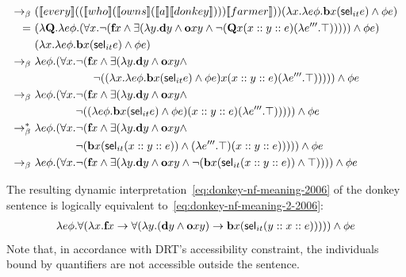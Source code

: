 \begin{example}
\begin{align}
\bconv \ &   (\trr{\I{every}}  ((\trr{\I{who}}  (\trr{\I{owns}}  (\trr{\I{a}}  \trr{\I{donkey}} ) ) ) \trr{\I{farmer}}  ))  ( \lambda \x1. \lambda e \phi.   \cbeat \x1  ( \selK_{it} e)  \land \phi e ) \notag \\
= \ &    ( \lambda  \Q2. \lambda e \phi. (\forall \x1. \neg ( \cfarmer \x1 \land   \exists (\lambda \y1.  \cdonkey \y1  \land  \cown \x1 \y1 \land  \neg (\Q2 \x1 (\upii{\x1}{\upii{\y1}{e}})  (\lambda e'''. \top)  ) ) ))  \land \phi e ) \notag \\
&  ( \lambda \x1. \lambda e \phi.   \cbeat \x1  ( \selK_{it} e)  \land \phi e ) \notag \\
\bconv \ &    \lambda e \phi. (\forall \x1. \neg ( \cfarmer \x1 \land   \exists (\lambda \y1.  \cdonkey \y1  \land  \cown \x1 \y1 \land \notag \\
& \phantom{aaaaaaaaaa}  \neg (( \lambda \x1. \lambda e \phi.   \cbeat \x1  ( \selK_{it} e)  \land \phi e ) \x1 (\upii{\x1}{\upii{\y1}{e}})  (\lambda e'''. \top)  ) ) ))  \land \phi e    \notag \\
\bconv \ &  \lambda e \phi. (\forall \x1. \neg ( \cfarmer \x1 \land   \exists (\lambda \y1.  \cdonkey \y1  \land  \cown \x1 \y1 \land \notag \\
& \phantom{aaaaaaa} \neg (( \lambda e \phi.   \cbeat \x1  ( \selK_{it} e)  \land \phi e ) (\upii{\x1}{\upii{\y1}{e}})  (\lambda e'''. \top)  ) ) ))  \land \phi e    \notag \\
\bred \ &  \lambda e \phi. (\forall \x1. \neg ( \cfarmer \x1 \land   \exists (\lambda \y1.  \cdonkey \y1  \land  \cown \x1 \y1 \land \notag \\
& \phantom{aaaaaaa} \neg (  \cbeat \x1  ( \selK_{it}  (\upii{\x1}{\upii{\y1}{e}}))  \land (\lambda e'''. \top)  (\upii{\x1}{\upii{\y1}{e}})   ) ) ))  \land \phi e    \notag \\
\bconv \ &\lambda e \phi. (\forall \x1. \neg ( \cfarmer \x1 \land   \exists (\lambda \y1.  \cdonkey \y1  \land  \cown \x1 \y1 \land  \neg (  \cbeat \x1  ( \selK_{it}  (\upii{\x1}{\upii{\y1}{e}}))  \land  \top  ) ) ))  \land \phi e     \label{eq:donkey-nf-meaning-2006}
\end{align}

The resulting dynamic interpretation~\eqref{eq:donkey-nf-meaning-2006} of the donkey sentence is logically equivalent to~\eqref{eq:donkey-nf-meaning-2-2006}:
\begin{align}
 \lambda e \phi. \forall ( \lambda \x1.  \cfarmer \x1  \rightarrow    \forall ( \lambda \y1.  ( \cdonkey \y1 \land  \cown \x1 \y1 ) \rightarrow   \cbeat \x1  ( \selK_{it} (\y1 :: \x1 :: e))  )  ) )  \land \phi e  \label{eq:donkey-nf-meaning-2-2006}
\end{align}
Note that, in accordance with DRT's accessibility constraint, the individuals bound by quantifiers are not accessible outside the sentence. 
\end{example}

